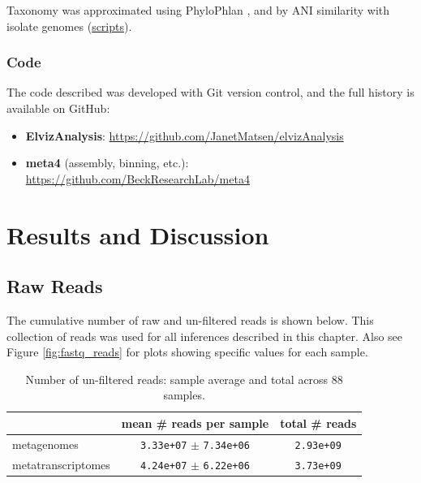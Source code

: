 Taxonomy was approximated using PhyloPhlan \cite{segata2013}, and by ANI similarity with isolate genomes (\href{https://github.com/BeckResearchLab/meta4/tree/master/m4b_binning/assembly/bin_info}{scripts}).

\subsubsection{Code}
The code described was developed with Git version control, and the full history is available on GitHub:
\begin{itemize}
    \item \textbf{ElvizAnalysis}: \url{https://github.com/JanetMatsen/elvizAnalysis}
    \item \textbf{meta4} (assembly, binning, etc.): \url{https://github.com/BeckResearchLab/meta4}
\end{itemize}

\section{Results and Discussion}


\subsection{Raw Reads}

The cumulative number of raw and un-filtered reads is shown below.
This collection of reads was used for all inferences described in this chapter.
Also see Figure \ref{fig:fastq_reads} for plots showing specific values for each sample.

\begin{table}[H]
\centering
\begin{singlespace}
\caption[Number of un-filtered reads: sample average and total]
	{Number of un-filtered reads: sample average and total across 88 samples.
	}
\begin{tabular}{l | cc}
        & mean \# reads per sample & total \# reads \\
\midrule
	metagenomes & \texttt{3.33e+07} $\pm$ \texttt{7.34e+06} & \texttt{2.93e+09} \\ %
	metatranscriptomes & \texttt{4.24e+07} $\pm$ \texttt{6.22e+06} &  \texttt{3.73e+09} \\
\end{tabular}
\label{table:sample_read_sizes}
\end{singlespace}
\end{table}



